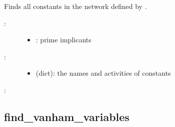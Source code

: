 \documentclass[letterpaper,10pt,english]{sphinxmanual}
\begin{document}
\begin{fulllineitems}
\label{\detokenize{PrimeImplicants:PyBoolNet.PrimeImplicants.find_constants}}
Finds all constants in the network defined by .
\begin{description}
\item[{:}] \leavevmode\begin{itemize}
\item {} 
: prime implicants

\end{itemize}

\item[{:}] \leavevmode\begin{itemize}
\item {} 
 (dict): the names and activities of constants

\end{itemize}

\end{description}

:

\begin{sphinxVerbatim}[commandchars=\\\{\}]
\end{sphinxVerbatim}

\end{fulllineitems}



\subsection{find\_vanham\_variables}
\label{\detokenize{PrimeImplicants:id6}}\label{\detokenize{PrimeImplicants:find-vanham-variables}}
\end{document}
